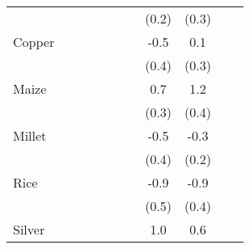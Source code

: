 {\begin{tabular}{l*{10}{c}}
                    &                     &                     &                     &                     &                     &                     &       (0.2)         &       (0.3)         &                     &                     \\
Copper              &                     &                     &                     &                     &                     &                     &        -0.5         &         0.1         &                     &                     \\
                    &                     &                     &                     &                     &                     &                     &       (0.4)         &       (0.3)         &                     &                     \\
Maize               &                     &                     &                     &                     &                     &                     &         0.7\sym{*}  &         1.2\sym{*}  &                     &                     \\
                    &                     &                     &                     &                     &                     &                     &       (0.3)         &       (0.4)         &                     &                     \\
Millet              &                     &                     &                     &                     &                     &                     &        -0.5         &        -0.3         &                     &                     \\
                    &                     &                     &                     &                     &                     &                     &       (0.4)         &       (0.2)         &                     &                     \\
Rice                &                     &                     &                     &                     &                     &                     &        -0.9         &        -0.9\sym{*}  &                     &                     \\
                    &                     &                     &                     &                     &                     &                     &       (0.5)         &       (0.4)         &                     &                     \\
Silver              &                     &                     &                     &                     &                     &                     &         1.0\sym{**} &         0.6         &                     &                     \\

\end{tabular}}
